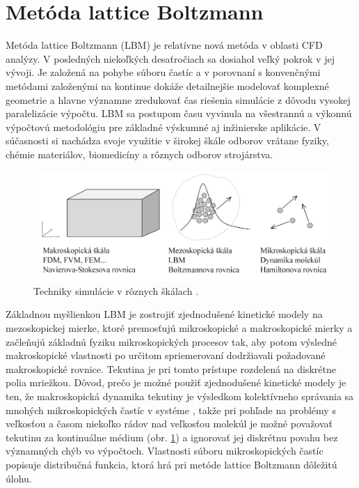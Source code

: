 \documentclass[]{tukediphc}
\begin{document}
\section{Metóda lattice Boltzmann}

Metóda lattice Boltzmann (LBM) je relatívne nová metóda v oblasti CFD analýzy. V posledných niekoľkých desaťročiach sa dosiahol veľký pokrok v jej vývoji. Je založená na pohybe súboru častíc a v porovnaní s konvenčnými metódami založenými na kontinue dokáže detailnejšie modelovať komplexné geometrie a hlavne významne zredukovať čas riešenia simulácie z dôvodu vysokej paralelizácie výpočtu. LBM sa postupom času vyvinula na všestrannú a výkonnú výpočtovú metodológiu pre základné výskumné aj inžinierske aplikácie. V súčasnosti si nachádza svoje využitie v širokej škále odborov vrátane fyziky, chémie materiálov, biomedicíny a rôznych odborov strojárstva.

\begin{figure}[!ht]
	\centering
	\includegraphics[width=1\textwidth,angle=0]{figures/different-scales.png}
	\caption{Techniky simulácie v rôznych škálach \citep{Mele2013}.}
	\label{o:scales}
\end{figure}

Základnou myšlienkou LBM je zostrojiť zjednodušené kinetické modely na mezoskopickej mierke, ktoré premosťujú mikroskopické a makroskopické mierky a začleňujú základnú fyziku mikroskopických procesov tak, aby potom výsledné makroskopické vlastnosti po určitom spriemerovaní dodržiavali požadované makroskopické rovnice. Tekutina je pri tomto prístupe rozdelená na diskrétne polia mriežkou. Dôvod, prečo je možné použiť zjednodušené kinetické modely je ten, že makroskopická dynamika tekutiny je výsledkom kolektívneho správania sa mnohých mikroskopických častíc v systéme \citep{Mele2013}, takže pri pohľade na problémy s veľkosťou a časom niekoľko rádov nad veľkosťou molekúl je možné považovať tekutinu za kontinuálne médium (obr. \ref{o:scales}) a ignorovať jej diskrétnu povahu bez významných chýb vo výpočtoch. Vlastnosti súboru mikroskopických častíc popisuje distribučná funkcia, ktorá hrá pri metóde lattice Boltzmann dôležitú úlohu.
\end{document}
